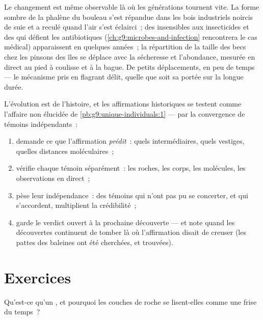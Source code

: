 \begin{example}\label{ex:g9:evidence-of-evolution:live}
Le changement est même observable là où les générations
tournent vite. La forme sombre de la phalène du bouleau
s'est répandue dans les bois industriels noircis de suie et
a reculé quand l'air s'est éclairci~; des 
insensibles aux insecticides et des  qui défient les
antibiotiques (\cref{ch:g9:microbes-and-infection}
rencontrera le cas médical) apparaissent en quelques
années~; la répartition de la taille des becs chez les
pinsons des îles se déplace avec la sécheresse et
l'abondance, mesurée en direct au pied à coulisse et à la
bague. De petits déplacements, en peu de temps --- le
mécanisme pris en flagrant délit, quelle que soit sa portée
sur la longue durée.
\end{example}

\begin{method}\label{met:g9:evidence-of-evolution:weigh}
L'évolution est de l'histoire, et les affirmations
historiques se testent comme l'affaire non élucidée de
\cref{pb:g9:unique-individuals:1} --- par la convergence de
témoins indépendants~:
\begin{enumerate}
  \item demande ce que l'affirmation \emph{prédit}~: quels
        intermédiaires, quels vestiges, quelles distances
        moléculaires~;
  \item vérifie chaque témoin séparément~: les roches, les
        corps, les molécules, les observations en direct~;
  \item pèse leur indépendance~: des témoins qui n'ont pas
        pu se concerter, et qui s'accordent, multiplient la
        crédibilité~;
  \item garde le verdict ouvert à la prochaine
        découverte --- et note quand les découvertes
        continuent de tomber là où l'affirmation disait de
        creuser (les pattes des baleines ont été cherchées,
        et trouvées).
\end{enumerate}
\end{method}

\section{Exercices}

\begin{exercise}[$\star$]\label{exo:g9:evidence-of-evolution:1}
Qu'est-ce qu'un , et pourquoi les couches de roche
se lisent-elles comme une frise du temps~?
\end{exercise}

